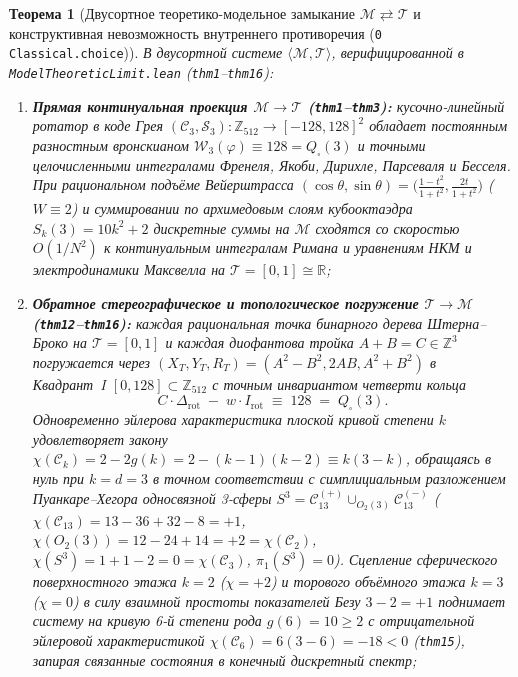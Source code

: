 \documentclass[11pt,a4paper]{article}
\newtheorem{theorem}{Теорема}[section]
\theoremstyle{definition}
\theoremstyle{remark}
\begin{document}
\begin{theorem}[Двусортное теоретико-модельное замыкание $\mathcal{M} \rightleftarrows \mathcal{T}$ и конструктивная невозможность внутреннего противоречия (\texttt{0 Classical.choice})]
\label{thm:bilateral-closure}
В двусортной системе $\langle\mathcal{M},\mathcal{T}\rangle$, верифицированной в \texttt{ModelTheoreticLimit.lean} (\texttt{thm1}--\texttt{thm16}):
\begin{enumerate}[label=\textbf{(\roman*)},leftmargin=*]
\item \textbf{Прямая континуальная проекция $\mathcal{M} \to \mathcal{T}$ (\texttt{thm1}--\texttt{thm3}):}
  кусочно-линейный ротатор в коде Грея $(\mathcal{C}_3,\mathcal{S}_3) : \mathbb{Z}_{512}\to[-128,128]^2$ обладает постоянным разностным вронскианом $\mathcal{W}_3(\varphi) \equiv 128 = Q_\square(3)$ и точными целочисленными интегралами Френеля, Якоби, Дирихле, Парсеваля и Бесселя. При рациональном подъёме Вейерштрасса $(\cos\theta,\sin\theta) = \bigl(\frac{1-t^2}{1+t^2},\frac{2t}{1+t^2}\bigr)$ ($W\equiv 2$) и суммировании по архимедовым слоям кубооктаэдра $S_k(3) = 10k^2 + 2$ дискретные суммы на $\mathcal{M}$ сходятся со скоростью $O(1/N^2)$ к континуальным интегралам Римана и уравнениям НКМ и электродинамики Максвелла на $\mathcal{T} = [0,1]\cong\mathbb{R}$;
\item \textbf{Обратное стереографическое и топологическое погружение $\mathcal{T} \to \mathcal{M}$ (\texttt{thm12}--\texttt{thm16}):}
  каждая рациональная точка бинарного дерева Штерна--Броко на $\mathcal{T} = [0,1]$ и каждая диофантова тройка $A+B=C\in\mathbb{Z}^3$ погружается через $(X_T,Y_T,R_T) = (A^2-B^2,2AB,A^2+B^2)$ в Квадрант~I $[0,128]\subset\mathbb{Z}_{512}$ с точным инвариантом четверти кольца
  \begin{equation}
    \label{eq:quarter-ring-lock}
    C\cdot\Delta_{\mathrm{rot}} \;-\; w\cdot I_{\mathrm{rot}} \;\equiv\; 128 \;=\; Q_\square(3).
  \end{equation}
  Одновременно эйлерова характеристика плоской кривой степени $k$ удовлетворяет закону $\chi(\mathcal{C}_k) = 2-2g(k) = 2-(k-1)(k-2) \equiv k(3-k)$, обращаясь в нуль при $k = d = 3$ в точном соответствии с симплициальным разложением Пуанкаре--Хегора односвязной 3-сферы $S^3 = \mathcal{C}_{13}^{(+)}\cup_{O_2(3)}\mathcal{C}_{13}^{(-)}$ ($\chi(\mathcal{C}_{13}) = 13-36+32-8 = +1$, $\chi(O_2(3)) = 12-24+14 = +2 = \chi(\mathcal{C}_2)$, $\chi(S^3) = 1+1-2 = 0 = \chi(\mathcal{C}_3)$, $\pi_1(S^3)=0$). Сцепление сферического поверхностного этажа $k=2$ ($\chi=+2$) и торового объёмного этажа $k=3$ ($\chi=0$) в силу взаимной простоты показателей Безу $3-2=+1$ поднимает систему на кривую 6-й степени рода $g(6)=10\ge 2$ с отрицательной эйлеровой характеристикой $\chi(\mathcal{C}_6) = 6(3-6) = -18 < 0$ (\texttt{thm15}), запирая связанные состояния в конечный дискретный спектр;

\end{enumerate}
\end{theorem}
\end{document}
